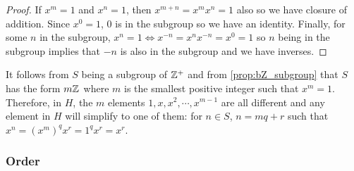 \documentclass[MathsNotesBase.tex]{subfiles}
\begin{document}
{	
	\begin{proof}
		If $x^m = 1$ and $x^n = 1$, then $x^{m+n} = x^mx^n = 1$ also so we have closure of addition. Since $x^0 = 1$, 0 is in the subgroup so we have an identity. Finally, for some $n$ in the subgroup, $x^n = 1 \iff x^{-n} = x^nx^{-n} = x^0 = 1$ so $n$ being in the subgroup implies that $-n$ is also in the subgroup and we have inverses.
	\end{proof}
	\begin{corollary}
		It follows from $S$ being a subgroup of $\mathbb{Z}^{+}$ and from \autoref{prop:bZ_subgroup} that $S$ has the form $m\mathbb{Z}^{}$ where $m$ is the smallest positive integer such that $x^m = 1$. Therefore, in $H$, the $m$ elements $1, x, x^2, \cdots , x^{m-1}$ are all different and any element in $H$ will simplify to one of them: for $n \in S$, $n = mq + r$ such that $x^n = (x^m)^qx^r = 1^qx^r = x^r$.
	\end{corollary}

	
	\bigskip
	\subsubsection{Order}
	

}
\end{document}
